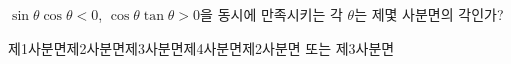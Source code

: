 $\sin\theta\cos\theta<0$, $\cos\theta\tan\theta>0$을 동시에 만족시키는 각 $\theta$는 제몇 사분면의 각인가?
\begin{choicesii}{제1사분면}{제2사분면}{제3사분면}{제4사분면}{제2사분면 또는 제3사분면}\end{choicesii}
